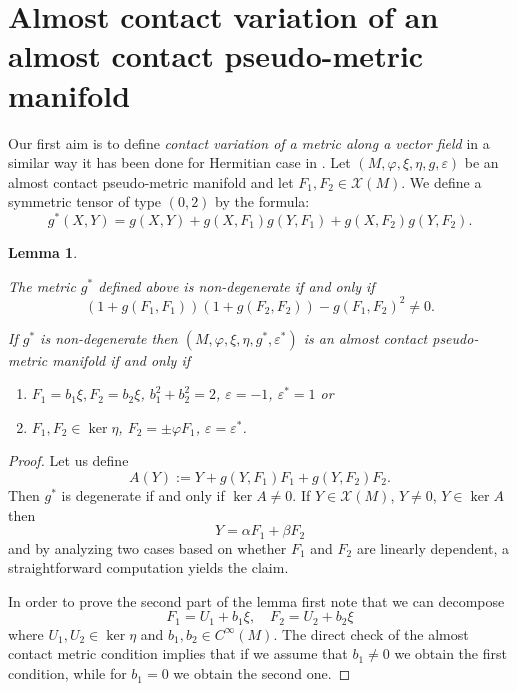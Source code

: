 \documentclass[12pt,a4paper,final]{amsart}
\numberwithin{equation}{section}
\newtheorem{lm}[tw]{Lemma}
\theoremstyle{df}
\newcommand{\X}{\mathcal{X}}
\newcommand{\XM}{\X(M)}
\newcommand{\Cniesk}{{C^\infty}}
\begin{document}
\section{Almost contact variation of an almost contact pseudo-metric manifold}
Our first aim is to define \emph{contact variation of a metric along a vector field} in a similar way it has been done for Hermitian case in \cite{MNO}.
Let $(M,\varphi,\xi,\eta,g,\varepsilon)$ be an almost contact pseudo-metric manifold and let $F_1,F_2\in\XM$. We define a symmetric tensor of type $(0,2)$ by the formula:
\begin{equation}\label{eq::Gast}
g^\ast(X,Y)=g(X,Y)+g(X,F_1)g(Y,F_1)+g(X,F_2)g(Y,F_2).
\end{equation}
\begin{lm}\label{lm::gast::general}

The metric $g^\ast$ defined above is non-degenerate if and only if
\begin{equation}\label{eq::GastNonDeg}
(1+g(F_1,F_1))(1+g(F_2,F_2))-g(F_1,F_2)^2\neq 0.
\end{equation}

If $g^\ast$ is non-degenerate then $(M,\varphi,\xi,\eta,g^\ast,\varepsilon^\ast)$ is
an almost contact pseudo-metric manifold if and only if
\begin{enumerate}
  \item $F_1=b_1\xi, F_2=b_2\xi$, $b_1^2+b_2^2=2$, $\varepsilon = -1$, $\varepsilon^\ast=1$ or
  \item $F_1, F_2\in\ker\eta$, $F_2=\pm \varphi F_1$, $\varepsilon = \varepsilon^\ast$.
\end{enumerate}
\end{lm}
\begin{proof}
Let us define
$$
A(Y):=Y+g(Y,F_1)F_1+g(Y,F_2)F_2.
$$ %
Then $g^\ast$ is degenerate if and only if $\ker A\neq 0$.
If $Y\in\XM$, $Y\neq 0$, $Y\in\ker A$ then
$$
Y=\alpha F_1+\beta F_2
$$
and by analyzing two cases based on whether $F_1$ and $F_2$ are linearly dependent, a straightforward computation yields the claim.



\par In order to prove the second part of the lemma first note that we can decompose
$$
F_1=U_1+b_1\xi,\quad F_2=U_2+b_2\xi
$$
where  $U_1,U_2\in\ker\eta$ and $b_1,b_2\in \Cniesk(M)$. The direct check of the almost contact metric condition implies that if we assume that $b_1\neq 0$ we obtain the first condition, while for $b_1=0$ we obtain the second one.
\end{proof}
\end{document}
